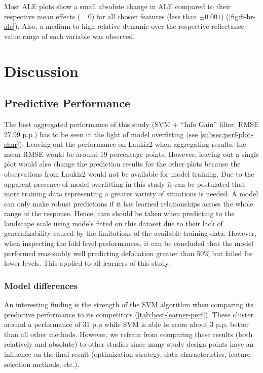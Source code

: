 \documentclass[letterpaper, peerreview, draftcls]{IEEEtran}
\begin{document}
Most ALE plots show a small absolute change in ALE compared to their respective mean effects (= 0) for all chosen features (less than $\pm 0.001$) (\autoref{fig:fi-hr-ale}).
Also, a medium-to-high relative dynamic over the respective reflectance value range of each variable was observed.

\section{Discussion}

\subsection{Predictive Performance}

The best aggregated performance of this study (SVM + \enquote{Info Gain} filter, RMSE 27.99 p.p.) has to be seen in the light of model overfitting (see \autoref{subsec:perf-plot-char}).
Leaving out the performance on Laukiz2 when aggregating results, the mean RMSE would be around 19 percentage points.
However, leaving out a single plot would also change the prediction results for the other plots because the observations from Laukiz2 would not be available for model training.
Due to the apparent presence of model overfitting in this study it can be postulated that more training data representing a greater variety of situations is needed.
A model can only make robust predictions if it has learned relationships across the whole range of the response.
Hence, care should be taken when predicting to the landscape scale using models fitted on this dataset due to their lack of generalizability caused by the limitations of the available training data.
However, when inspecting the fold level performances, it can be concluded that the model performed reasonably well predicting defoliation greater than 50\% but failed for lower levels.
This applied to all learners of this study.

\subsubsection{Model differences}

An interesting finding is the strength of the SVM algorithm when comparing its predictive performance to its competitors (\autoref{tab:best-learner-perf}).
These cluster around a performance of 31 p.p while SVM is able to score about 3 p.p. better than all other methods.
However, we refrain from comparing these results (both relatively and absolute) to other studies since many study design points have an influence on the final result (optimization strategy, data characteristics, feature selection methods, etc.).
\end{document}
